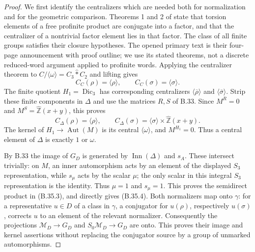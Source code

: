 \begin{proof}
We first identify the centralizers which are needed both for
normalization and for the geometric comparison.  Theorems 1 and 2
of \citet[printed p.~31]{B35HerfortRibes1984} state that torsion
elements of a free profinite product are conjugate into a factor,
and that the centralizer of a nontrivial factor element lies in
that factor.  The class of all finite groups satisfies their
closure hypotheses.  The opened primary text is their four-page
announcement with proof outline; we use its stated theorems,
not a discrete reduced-word argument applied to profinite words.
Applying the centralizer theorem to
$C/\langle\omega\rangle=C_3\widehat *C_2$ and lifting gives
\[
 C_C(\rho)=\langle\rho\rangle,
 \qquad C_C(\sigma)=\langle\sigma\rangle.                 \tag{B.35.5}
\]
The finite quotient $H_1=\operatorname{Dic}_3$ has corresponding
centralizers $\langle\overline\rho\rangle$ and
$\langle\overline\sigma\rangle$.  Strip these finite components
in $\Delta$ and use the matrices $R,S$ of B.33.  Since
$M^R=0$ and $M^S=\widehat{\mathbb Z}(x+y)$, this proves
\[
 C_\Delta(\rho)=\langle\rho\rangle,
 \qquad
 C_\Delta(\sigma)=\langle\sigma\rangle
                         \times\widehat{\mathbb Z}(x+y).
                                                        \tag{B.35.6}
\]
The kernel of $H_1\to\operatorname{Aut}(M)$ is its central
$\langle\omega\rangle$, and $M^{H_1}=0$.  Thus a central
element of $\Delta$ is exactly $1$ or $\omega$.

By B.33 the image of $G_D$ is generated by
$\operatorname{Inn}(\Delta)$ and $s_A$.  These intersect trivially:
on $M$, an inner automorphism acts by an element of the displayed
$S_3$ representation, while $s_\mu$ acts by the scalar $\mu$;
the only scalar in this integral $S_3$ representation is the identity.
Thus $\mu=1$ and $s_\mu=1$.  This proves the semidirect product
in (B.35.3), and directly gives (B.35.4).  Both normalizers map
onto $\gamma$: for a representative $u\in D$ of a class in
$\gamma$, a conjugator for $u(\rho)$, respectively $u(\sigma)$,
corrects $u$ to an element of the relevant normalizer.
Consequently the projections $\mathcal M_D\to G_D$ and
$S_0\mathcal M_D\to G_D$ are onto.  This proves their image
and kernel assertions without replacing the conjugator source
by a group of unmarked automorphisms.


\end{proof}

